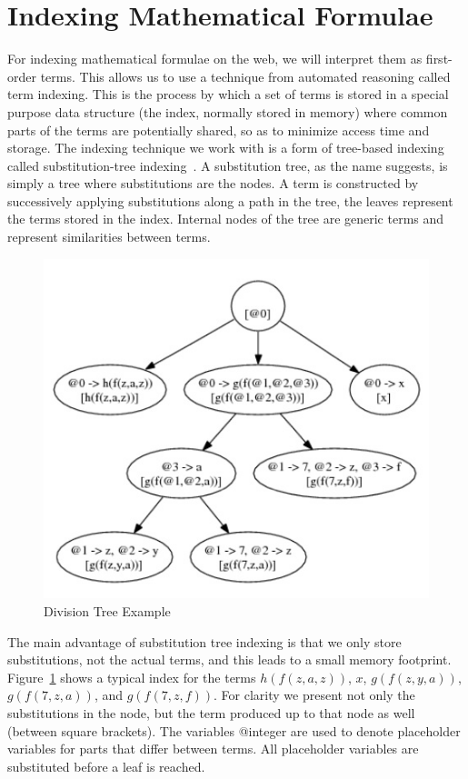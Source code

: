 \documentclass{deliverablereport}
\begin{document}
\section{Indexing Mathematical Formulae}\label{sec:mathindex}

For indexing mathematical formulae on the web, we will interpret them as first-order
terms. This allows us to use a technique from automated reasoning called term
indexing. This is the process by which a set of terms is stored in a special purpose data
structure (the index, normally stored in memory) where common parts of the terms are
potentially shared, so as to minimize access time and storage. The indexing technique we
work with is a form of tree-based indexing called substitution-tree indexing~\cite{KohSuc:asemf06}. A
substitution tree, as the name suggests, is simply a tree where substitutions are the
nodes. A term is constructed by successively applying substitutions along a path in the
tree, the leaves represent the terms stored in the index. Internal nodes of the tree are
generic terms and represent similarities between terms.

\begin{figure}[h]
\centering
 \includegraphics[scale=0.9]{figure1.jpg}
 \caption{Division Tree Example}
 \label{fig:tree}
\end{figure}

The main advantage of substitution tree indexing is that we only store substitutions, not
the actual terms, and this leads to a small memory footprint. Figure~\ref{fig:tree} shows a typical
index for the terms $h(f(z, a, z))$, $x$, $g(f(z, y, a))$, $g(f(7, z, a))$, and
$g(f(7, z, f))$. For clarity we present not only the substitutions in the node, but the
term produced up to that node as well (between square brackets). The variables @integer
are used to denote placeholder variables for parts that differ between terms. All
placeholder variables are substituted before a leaf is reached.
\end{document}
